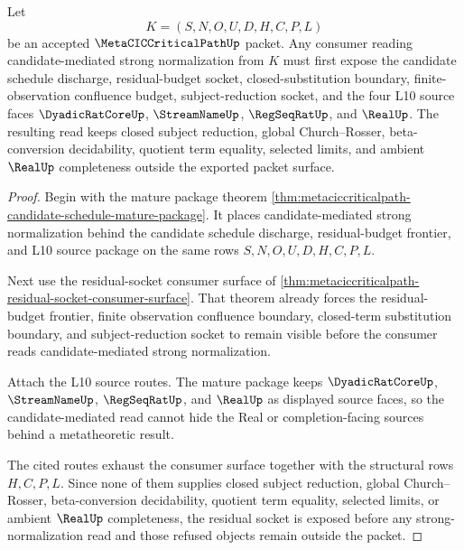 \begin{theorem}
\label{thm:metaciccriticalpath-residual-socket-before-sn-read}
Let
$$
K=(S,N,O,U,D,H,C,P,L)
$$
be an accepted $\MetaCICCriticalPathUp$ packet. Any consumer reading candidate-mediated strong normalization from $K$ must first expose the candidate schedule discharge, residual-budget socket, closed-substitution boundary, finite-observation confluence budget, subject-reduction socket, and the four L10 source faces $\DyadicRatCoreUp$, $\StreamNameUp$, $\RegSeqRatUp$, and $\RealUp$. The resulting read keeps closed subject reduction, global Church--Rosser, beta-conversion decidability, quotient term equality, selected limits, and ambient $\RealUp$ completeness outside the exported packet surface.
\end{theorem}
\begin{proof}
Begin with the mature package theorem \autoref{thm:metaciccriticalpath-candidate-schedule-mature-package}. It places candidate-mediated strong normalization behind the candidate schedule discharge, residual-budget frontier, and L10 source package on the same rows $S,N,O,U,D,H,C,P,L$.

Next use the residual-socket consumer surface of \autoref{thm:metaciccriticalpath-residual-socket-consumer-surface}. That theorem already forces the residual-budget frontier, finite observation confluence boundary, closed-term substitution boundary, and subject-reduction socket to remain visible before the consumer reads candidate-mediated strong normalization.

Attach the L10 source routes. The mature package keeps $\DyadicRatCoreUp$, $\StreamNameUp$, $\RegSeqRatUp$, and $\RealUp$ as displayed source faces, so the candidate-mediated read cannot hide the Real or completion-facing sources behind a metatheoretic result.

The cited routes exhaust the consumer surface together with the structural rows $H,C,P,L$. Since none of them supplies closed subject reduction, global Church--Rosser, beta-conversion decidability, quotient term equality, selected limits, or ambient $\RealUp$ completeness, the residual socket is exposed before any strong-normalization read and those refused objects remain outside the packet.
\end{proof}

